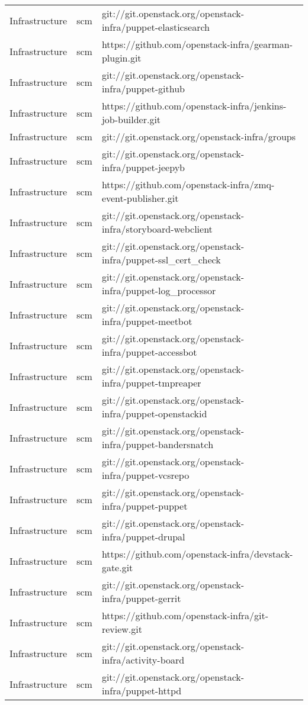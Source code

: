 \begin{center}
\begin{longtable}{|p{4cm}|p{1cm}|p{10cm}|}
Infrastructure&scm&git://git.openstack.org/openstack-infra/puppet-elasticsearch\\
Infrastructure&scm&https://github.com/openstack-infra/gearman-plugin.git\\
Infrastructure&scm&git://git.openstack.org/openstack-infra/puppet-github\\
Infrastructure&scm&https://github.com/openstack-infra/jenkins-job-builder.git\\
Infrastructure&scm&git://git.openstack.org/openstack-infra/groups\\
Infrastructure&scm&git://git.openstack.org/openstack-infra/puppet-jeepyb\\
Infrastructure&scm&https://github.com/openstack-infra/zmq-event-publisher.git\\
Infrastructure&scm&git://git.openstack.org/openstack-infra/storyboard-webclient\\
Infrastructure&scm&git://git.openstack.org/openstack-infra/puppet-ssl\_cert\_check\\
Infrastructure&scm&git://git.openstack.org/openstack-infra/puppet-log\_processor\\
Infrastructure&scm&git://git.openstack.org/openstack-infra/puppet-meetbot\\
Infrastructure&scm&git://git.openstack.org/openstack-infra/puppet-accessbot\\
Infrastructure&scm&git://git.openstack.org/openstack-infra/puppet-tmpreaper\\
Infrastructure&scm&git://git.openstack.org/openstack-infra/puppet-openstackid\\
Infrastructure&scm&git://git.openstack.org/openstack-infra/puppet-bandersnatch\\
Infrastructure&scm&git://git.openstack.org/openstack-infra/puppet-vcsrepo\\
Infrastructure&scm&git://git.openstack.org/openstack-infra/puppet-puppet\\
Infrastructure&scm&git://git.openstack.org/openstack-infra/puppet-drupal\\
Infrastructure&scm&https://github.com/openstack-infra/devstack-gate.git\\
Infrastructure&scm&git://git.openstack.org/openstack-infra/puppet-gerrit\\
Infrastructure&scm&https://github.com/openstack-infra/git-review.git\\
Infrastructure&scm&git://git.openstack.org/openstack-infra/activity-board\\
Infrastructure&scm&git://git.openstack.org/openstack-infra/puppet-httpd\\

\end{longtable}
\end{center}
